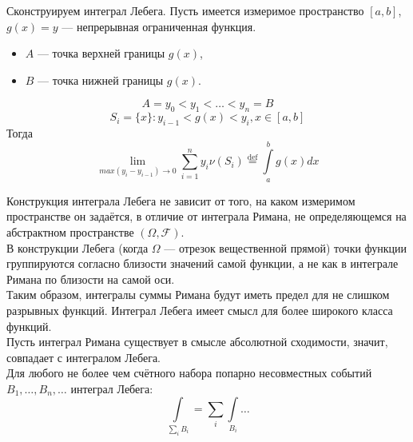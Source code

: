 \begin{interjection}
	Сконструируем интеграл Лебега. Пусть имеется измеримое пространство $[a, b]$, $g(x) = y$ --- непрерывная ограниченная функция.
	\begin{itemize}
		\item $A$ --- точка верхней границы $g(x)$,
		\item $B$ --- точка нижней границы $g(x)$.
	\end{itemize}
	\[
		A = y_0 < y_1 < \ldots < y_n = B
	\]
	\[
		S_i = \{ x \}: y_{i - 1} < g(x) < y_i, x \in [a, b]
	\]
	Тогда
	\[
		\lim\limits_{max(y_i - y_{i - 1}) \to 0} \sum\limits_{i = 1}^n y_i \nu (S_i) \overset{\textrm{def}}{=} \int\limits_a^b g(x) dx
	\]
\end{interjection}

\begin{addition}
	Конструкция интеграла Лебега не зависит от того, на каком измеримом пространстве он задаётся, в отличие от интеграла Римана, не определяющемся на абстрактном пространстве $(\Omega, \mathcal{F})$. \\
	В конструкции Лебега (когда $\Omega$ --- отрезок вещественной прямой) точки функции группируются согласно близости значений самой функции, а не как в интеграле Римана по близости на самой оси. \\
	Таким образом, интегралы суммы Римана будут иметь предел для не слишком разрывных функций. Интеграл Лебега имеет смысл для более широкого класса функций. \\
	Пусть интеграл Римана существует в смысле абсолютной сходимости, значит, совпадает с интегралом Лебега. \\
	Для любого не более чем счётного набора попарно несовместных событий $B_1, \ldots, B_n, \ldots$ интеграл Лебега:
	\[
		\int\limits_{\sum\limits_i B_i} = \sum\limits_i \int\limits_{B_i} \ldots
	\]
\end{addition}

